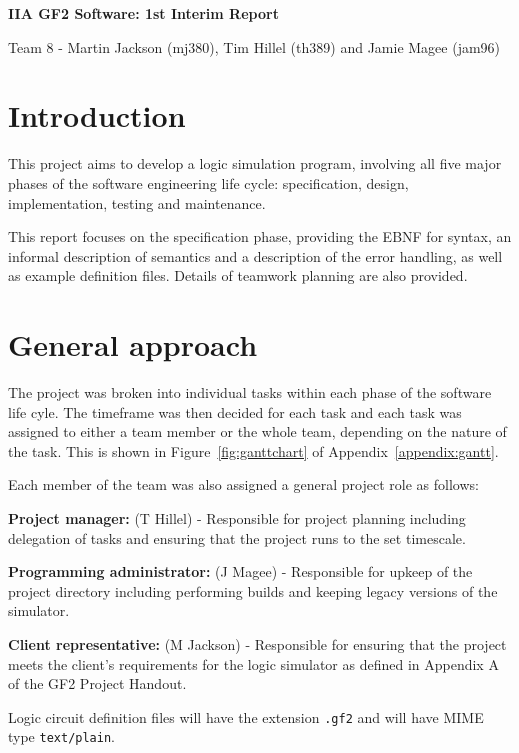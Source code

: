 \documentclass[a4paper,10pt]{article}
\begin{document}
\begin{center}
\LARGE \textbf{IIA GF2 Software: 1st Interim Report}

\small Team 8 - Martin Jackson (mj380), Tim Hillel (th389) and Jamie Magee (jam96)
\end{center}



\section{Introduction}

This project aims to develop a logic simulation program, involving all five major phases of the software engineering life cycle: specification, design, implementation, testing and maintenance.

This report focuses on the specification phase, providing the EBNF for syntax, an informal description of semantics and a description of the error handling, as well as example definition files.
Details of teamwork planning are also provided.

\section{General approach}

The project was broken into individual tasks within each phase of the software life cyle.
The timeframe was then decided for each task and each task was assigned to either a team member or the whole team, depending on the nature of the task.
This is shown in Figure~\ref{fig:ganttchart} of Appendix~\ref{appendix:gantt}.

Each member of the team was also assigned a general project role as follows:

\textbf{Project manager:} (T Hillel) - Responsible for project planning including delegation of tasks and ensuring that the project runs to the set timescale.

\textbf{Programming administrator:} (J Magee) - Responsible for upkeep of the project directory including performing builds and keeping legacy versions of the simulator.

\textbf{Client representative:} (M Jackson) - Responsible for ensuring that the project meets the client's requirements for the logic simulator as defined in Appendix A of the GF2 Project Handout.

Logic circuit definition files will have the extension \texttt{.gf2} and will have MIME type \texttt{text/plain}.
\end{document}
